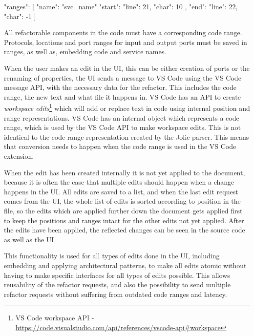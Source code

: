 \begin{jsonlisting}[][caption={JSON representing a code range created by the Jolie parser}, label={lst:code_ranges}]
{
    "ranges": [
        {
            "name": "svc_name"
            "start": {
                "line": 21,
                "char": 10
            },
            "end": {
                "line": 22,
                "char": -1
            }
        }
    ]
}
\end{jsonlisting}

All refactorable components in the code must have a corresponding code range. Protocols,
locations and port ranges for input and output ports must be saved in ranges, as well as, embedding code and service names.

When the user makes an edit in the UI, this can be either creation of ports or the renaming of properties, the UI sends a message to VS Code using the VS Code message API, with the necessary data for the refactor. This includes
the code range, the new text and what file it happens in. VS Code has an API to create \textit{workspace edits}\footnote{VS Code workspace API - \url{https://code.visualstudio.com/api/references/vscode-api\#workspace}} which will add or replace text in code using internal position and range representations.
VS Code has an internal object which represents a code range, which is used by the VS Code API to make workspace edits. This is not identical to the code range representation created by the Jolie parser.
This means that conversion needs to happen when the code range is used in the VS Code extension.

When the edit has been created internally it is not yet applied to the document, because it is often the case that multiple edits should happen when a change happens in the UI.
All edits are saved to a list, and when the last edit request comes from the UI, the whole list of edits is sorted according to position in the file, so the edits which are applied further down the document gets applied first to keep the positions and ranges intact for the other edits not yet applied.
After the edits have been applied, the reflected changes can be seen in the source code as well as the UI.

This functionality is used for all types of edits done in the UI, including embedding and applying architectural patterns, to make all edits atomic without having to make specific interfaces for all types of edits possible. 
This allows reusability of the refactor requests, and also the possibility to send multiple refactor requests without suffering from outdated code ranges and latency.

